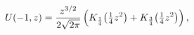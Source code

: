 \[\mathop{U\/}\nolimits\!\left(-1,z\right)=\frac{z^{3/2}}{2\sqrt{2\pi}}\left(%
\mathop{K_{\frac{1}{4}}\/}\nolimits\!\left(\tfrac{1}{4}z^{2}\right)+\mathop{K_%
{\frac{3}{4}}\/}\nolimits\!\left(\tfrac{1}{4}z^{2}\right)\right),\]